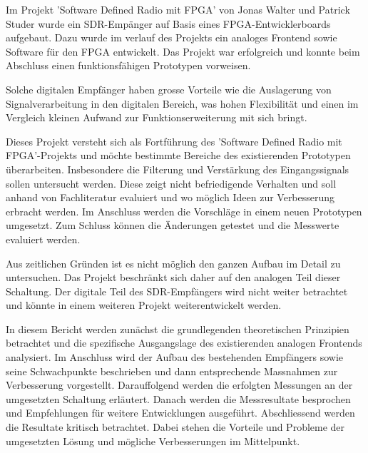 Im Projekt 'Software Defined Radio mit FPGA' von Jonas Walter und Patrick Studer\cite{SDRprev} wurde ein SDR-Empänger auf Basis eines FPGA-Entwicklerboards aufgebaut. Dazu wurde im verlauf des Projekts ein analoges Frontend sowie Software für den FPGA entwickelt. Das Projekt war erfolgreich und konnte beim Abschluss einen funktionsfähigen Prototypen vorweisen.

Solche digitalen Empfänger haben grosse Vorteile wie die Auslagerung von Signalverarbeitung in den digitalen Bereich, was hohen Flexibilität und einen im Vergleich kleinen Aufwand zur Funktionserweiterung mit sich bringt.

Dieses Projekt versteht sich als Fortführung des 'Software Defined Radio mit FPGA'-Projekts und möchte bestimmte Bereiche des existierenden Prototypen überarbeiten. Insbesondere die Filterung und Verstärkung des Eingangssignals sollen untersucht werden. Diese zeigt nicht befriedigende Verhalten und soll anhand von Fachliteratur evaluiert und wo möglich Ideen zur Verbesserung erbracht werden. Im Anschluss werden die Vorschläge in einem neuen Prototypen umgesetzt. Zum Schluss können die Änderungen getestet und die Messwerte evaluiert werden.

Aus zeitlichen Gründen ist es nicht möglich den ganzen Aufbau im Detail zu untersuchen. Das Projekt beschränkt sich daher auf den analogen Teil dieser Schaltung. Der digitale Teil des SDR-Empfängers wird nicht weiter betrachtet und könnte in einem weiteren Projekt weiterentwickelt werden.

In diesem Bericht werden zunächst die grundlegenden theoretischen Prinzipien betrachtet und die spezifische Ausgangslage des existierenden analogen Frontends analysiert.
Im Anschluss wird der Aufbau des bestehenden Empfängers sowie seine Schwachpunkte beschrieben und dann entsprechende Massnahmen zur Verbesserung vorgestellt. Darauffolgend werden die erfolgten Messungen an der umgesetzten Schaltung erläutert. Danach werden die Messresultate besprochen und Empfehlungen für weitere Entwicklungen ausgeführt. Abschliessend werden die Resultate kritisch betrachtet. Dabei stehen die Vorteile und Probleme der umgesetzten Lösung und mögliche Verbesserungen im Mittelpunkt.
